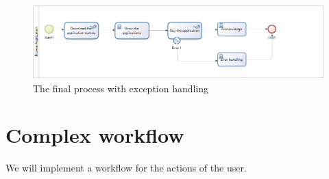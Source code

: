 \documentclass[]{report}
\let\Oldincludegraphics\includegraphics
\renewcommand{\includegraphics}[1]{
\begin{adjustbox}{max size={\textwidth}{\textheight}}
    \Oldincludegraphics[scale=0.6]{#1}%
\end{adjustbox}
}
\begin{document}
\begin{figure}[htbp]
\centering
\includegraphics{img/bpmn/bonita_browse_application_process_exceptions.png}
\caption{The final process with exception handling}
\end{figure}

\section{Complex workflow}

We will implement a workflow for the actions of the user.
\end{document}
